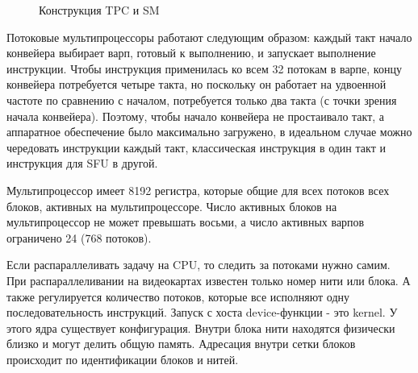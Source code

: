 \documentclass[a4paper,14pt,russian]{extreport}
\begin{document}
  \begin{figure}[h]
  \caption{Конструкция TPC и SM}
  \label{ris:tpc}
  \end{figure}
\par Потоковые мультипроцессоры работают следующим образом: каждый такт начало конвейера выбирает варп, готовый к выполнению, и запускает выполнение инструкции. Чтобы инструкция применилась ко всем 32 потокам в варпе, концу конвейера потребуется четыре такта, но поскольку он работает на удвоенной частоте по сравнению с началом, потребуется только два такта (с точки зрения начала конвейера). Поэтому, чтобы начало конвейера не простаивало такт, а аппаратное обеспечение было максимально загружено, в идеальном случае можно чередовать инструкции каждый такт, классическая инструкция в один такт и инструкция для SFU в другой.
\par Мультипроцессор имеет 8192 регистра, которые общие для всех потоков всех блоков, активных на мультипроцессоре. Число активных блоков на мультипроцессор не может превышать восьми, а число активных варпов ограничено 24 (768 потоков).
\par Если распараллеливать задачу на CPU, то следить за потоками нужно самим. При распараллеливании на видеокартах известен только номер нити или блока. А также регулируется количество потоков, которые все исполняют одну последовательность инструкций. Запуск с хоста device-функции - это kernel. У этого ядра существует конфигурация. Внутри блока нити находятся физически близко и могут делить общую память. Адресация внутри сетки блоков происходит по идентификации блоков и нитей.
\end{document}
